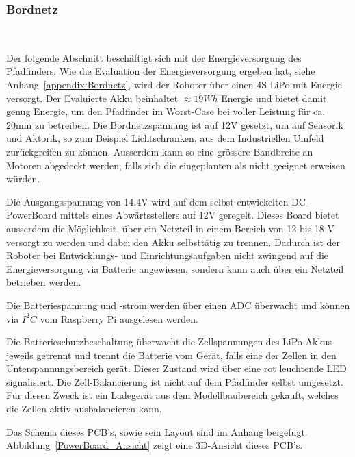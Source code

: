 \documentclass[main.tex]{subfiles} %
\begin{document}

\subsubsection{Bordnetz}~\label{sec:Bordnetz}

Der folgende Abschnitt beschäftigt sich mit der Energieversorgung des
Pfadfinders. Wie die Evaluation der Energieversorgung ergeben hat, siehe
Anhang~\ref{appendix:Bordnetz}, wird der Roboter über einen 4S-LiPo mit
Energie versorgt. Der Evaluierte Akku beinhaltet $\approx 19Wh$ Energie und
bietet damit genug Energie, um den Pfadfinder im Worst-Case bei voller Leistung
für ca. 20min zu betreiben. Die Bordnetzspannung ist auf 12V gesetzt, um auf
Sensorik und Aktorik, so zum Beispiel Lichtschranken, aus dem Industriellen
Umfeld zurückgreifen zu können. Ausserdem kann so eine grössere Bandbreite an
Motoren abgedeckt werden, falls sich die eingeplanten als nicht geeignet
erweisen würden. 

Die Ausgangsspannung von 14.4V wird auf dem selbst entwickelten DC-PowerBoard
mittels eines Abwärtsstellers auf 12V geregelt. Dieses Board bietet ausserdem
die Möglichkeit, über ein Netzteil in einem Bereich von 12 bis 18 V versorgt zu
werden und dabei den Akku selbsttätig zu trennen. Dadurch ist der Roboter bei
Entwicklungs- und Einrichtungsaufgaben nicht zwingend auf die Energieversorgung
via Batterie angewiesen, sondern kann auch über ein Netzteil betrieben werden.

Die Batteriespannung und -strom werden über einen ADC überwacht und können via
$I^2C$ vom Raspberry Pi ausgelesen werden.

Die Batterieschutzbeschaltung überwacht die Zellspannungen des LiPo-Akkus
jeweils getrennt und trennt die Batterie vom Gerät, falls eine der Zellen in
den Unterspannungsbereich gerät. Dieser Zustand wird über eine rot leuchtende
LED signalisiert. Die Zell-Balancierung ist nicht auf dem Pfadfinder selbst
umgesetzt. Für diesen Zweck ist ein Ladegerät aus dem Modellbaubereich gekauft,
welches die Zellen aktiv ausbalancieren kann.

Das Schema dieses PCB's, sowie sein Layout sind im Anhang beigefügt.
Abbildung~\ref{PowerBoard_Ansicht} zeigt eine 3D-Ansicht dieses PCB's.
\end{document}
